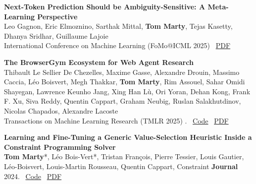\documentclass[letterpaper,11pt]{article}
\begin{document}
\begin{tcolorbox}[enhanced, rounded corners, colback=white, colframe=black!10!white, boxrule=0.5mm, left=10pt, right=10pt, top=6pt, bottom=3pt]
    \textbf{Next-Token Prediction Should be Ambiguity-Sensitive: A Meta-Learning Perspective} \\
    Leo Gagnon, Eric Elmoznino, Sarthak Mittal, \textbf{Tom Marty}, Tejas Kasetty, Dhanya Sridhar, Guillaume Lajoie \\
    International Conference on Machine Learning (FoMo@ICML 2025)  \hfill \quad
    \faFilePdf \, \href{https://openreview.net/forum?id=vE0bhgmDze&referrer=%5BAuthor%20Console%5D(%2Fgroup%3Fid%3DICML.cc%2F2025%2FWorkshop%2FES-FoMo-III%2FAuthors%23your-submissions)}{PDF}
\end{tcolorbox}

\begin{tcolorbox}[enhanced, rounded corners, colback=white, colframe=black!10!white, boxrule=0.5mm, left=10pt, right=10pt, top=6pt, bottom=3pt]
    \textbf{The BrowserGym Ecosystem for Web Agent Research} \\
    Thibault Le Sellier De Chezelles, Maxime Gasse, Alexandre Drouin, Massimo Caccia, Léo Boisvert, Megh Thakkar, \textbf{Tom Marty}, Rim Assouel, Sahar Omidi Shayegan, Lawrence Keunho Jang, Xing Han Lù, Ori Yoran, Dehan Kong, Frank F. Xu, Siva Reddy, Quentin Cappart, Graham Neubig, Ruslan Salakhutdinov, Nicolas Chapados, Alexandre Lacoste \\
        Transactions on Machine Learning Research (TMLR 2025) . \hfill  \faCode  \, \href{https://github.com/ServiceNow/BrowserGym}{Code} \quad
    \faFilePdf \, \href{https://arxiv.org/abs/2412.05467}{PDF}
\end{tcolorbox}

\begin{tcolorbox}[enhanced, rounded corners, colback=white, colframe=black!10!white, boxrule=0.5mm, left=10pt, right=10pt, top=6pt, bottom=3pt]
    \textbf{Learning and Fine-Tuning a Generic Value-Selection Heuristic Inside a Constraint Programming Solver} \\
    \textbf{Tom Marty}*, Léo Bois-Vert*, Tristan François, Pierre Tessier, Louis Gautier, Léo-Boisvert, Louis-Martin Rousseau, Quentin Cappart, Constraint \textbf{Journal} 2024.
 \hfill \faCode  \, \href{https://github.com/corail-research/SeaPearl.jl}{Code} \quad\faFilePdf \, \href{https://link.springer.com/article/10.1007/s10601-024-09377-4}{PDF}
\end{tcolorbox}
\end{document}

